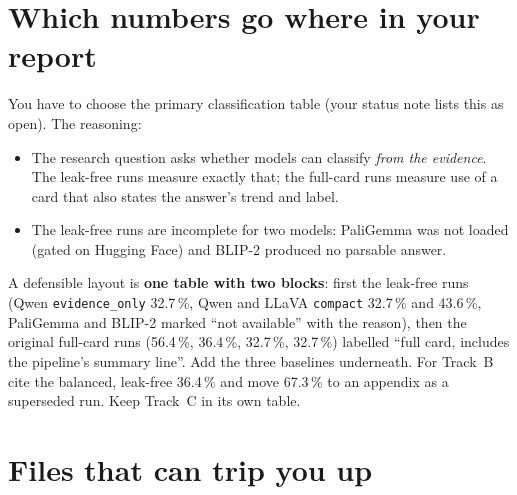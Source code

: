 \section{Which numbers go where in your report}

You have to choose the primary classification table (your status note lists this as open). The reasoning:

\begin{itemize}
  \item The research question asks whether models can classify \emph{from the evidence}. The leak-free runs measure exactly that; the full-card runs measure use of a card that also states the answer's trend and label.
  \item The leak-free runs are incomplete for two models: PaliGemma was not loaded (gated on Hugging Face) and BLIP-2 produced no parsable answer.
\end{itemize}

\begin{foryourreport}
A defensible layout is \textbf{one table with two blocks}: first the leak-free runs (Qwen \texttt{evidence\_only} 32.7\,\%, Qwen and LLaVA \texttt{compact} 32.7\,\% and 43.6\,\%, PaliGemma and BLIP-2 marked ``not available'' with the reason), then the original full-card runs (56.4\,\%, 36.4\,\%, 32.7\,\%, 32.7\,\%) labelled ``full card, includes the pipeline's summary line''. Add the three baselines underneath. For Track~B cite the balanced, leak-free 36.4\,\% and move 67.3\,\% to an appendix as a superseded run. Keep Track~C in its own table.
\end{foryourreport}

\section{Files that can trip you up}

